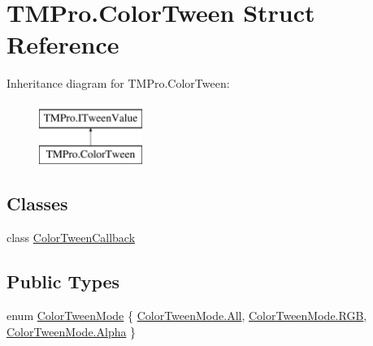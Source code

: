 \hypertarget{struct_t_m_pro_1_1_color_tween}{}\section{T\+M\+Pro.\+Color\+Tween Struct Reference}
\label{struct_t_m_pro_1_1_color_tween}
Inheritance diagram for T\+M\+Pro.\+Color\+Tween\+:\begin{figure}[H]
\begin{center}
\leavevmode
\includegraphics[height=2.000000cm]{struct_t_m_pro_1_1_color_tween}
\end{center}
\end{figure}
\subsection*{Classes}
\begin{DoxyCompactItemize}
\item 
class \mbox{\hyperlink{class_t_m_pro_1_1_color_tween_1_1_color_tween_callback}{Color\+Tween\+Callback}}
\end{DoxyCompactItemize}
\subsection*{Public Types}
\begin{DoxyCompactItemize}
\item 
enum \mbox{\hyperlink{struct_t_m_pro_1_1_color_tween_a22465a1cc95d87abd9ca22c2dd021fbd}{Color\+Tween\+Mode}} \{ \mbox{\hyperlink{struct_t_m_pro_1_1_color_tween_a22465a1cc95d87abd9ca22c2dd021fbdab1c94ca2fbc3e78fc30069c8d0f01680}{Color\+Tween\+Mode.\+All}}, 
\mbox{\hyperlink{struct_t_m_pro_1_1_color_tween_a22465a1cc95d87abd9ca22c2dd021fbda889574aebacda6bfd3e534e2b49b8028}{Color\+Tween\+Mode.\+R\+GB}}, 
\mbox{\hyperlink{struct_t_m_pro_1_1_color_tween_a22465a1cc95d87abd9ca22c2dd021fbda6132295fcf5570fb8b0a944ef322a598}{Color\+Tween\+Mode.\+Alpha}}
 \}
\end{DoxyCompactItemize}
